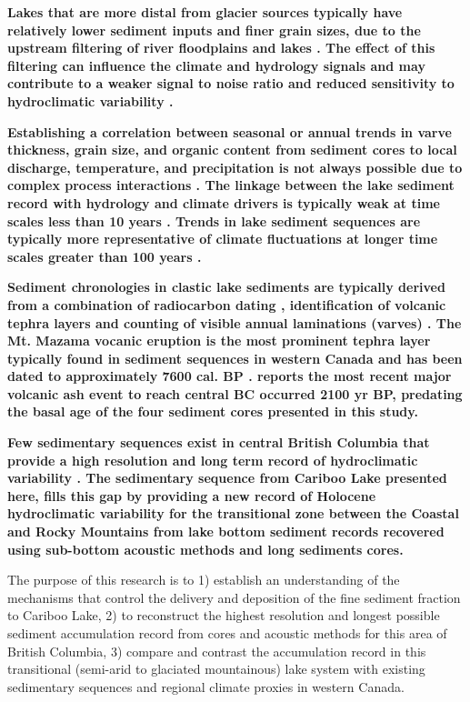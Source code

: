 \documentclass[Royal,times,doublespace,sageh]{sagej}
\begin{document}
\textbf{Lakes that are more distal from glacier sources typically have
relatively lower sediment inputs and finer grain sizes, due to the
upstream filtering of river floodplains and lakes \citep{Hodder2007c}.
The effect of this filtering can influence the climate and hydrology
signals and may contribute to a weaker signal to noise ratio and reduced
sensitivity to hydroclimatic variability \citep{Jerolmack2010}.}

\textbf{Establishing a correlation between seasonal or annual trends in
varve thickness, grain size, and organic content from sediment cores to
local discharge, temperature, and precipitation is not always possible
due to complex process interactions
\citep{Hodder2007c, Menounos2008c, Heideman2017}. The linkage between
the lake sediment record with hydrology and climate drivers is typically
weak at time scales less than 10 years
\citep{Hodder2007c, Menounos2008c, Heideman2017}. Trends in lake
sediment sequences are typically more representative of climate
fluctuations at longer time scales greater than 100 years
\citep{Leonard1999, Osborn2007, Heideman2017}.}

\textbf{Sediment chronologies in clastic lake sediments are typically
derived from a combination of radiocarbon dating
\citep{Gilbert2012, Hodder2006b, Steinman2019}, identification of
volcanic tephra layers \citep{Gilbert2012, Hodder2006b, Steinman2019}
and counting of visible annual laminations (varves)
\citep{Hodder2006b, Heideman2015}. The Mt. Mazama vocanic eruption is
the most prominent tephra layer typically found in sediment sequences in
western Canada \citep{Gilbert2012, Steinman2019} and has been dated to
approximately 7600 cal. BP \citep{Zdanowicz1999, Hallett1997}.
\citet{Westgate1977} reports the most recent major volcanic ash event to
reach central BC occurred 2100 yr BP, predating the basal age of the
four sediment cores presented in this study.}

\textbf{Few sedimentary sequences exist in central British Columbia that
provide a high resolution and long term record of hydroclimatic
variability
\citep{Gilbert2012, Hodder2006b, Menounos2009b, Maurer2012b}. The
sedimentary sequence from Cariboo Lake presented here, fills this gap by
providing a new record of Holocene hydroclimatic variability for the
transitional zone between the Coastal and Rocky Mountains from lake
bottom sediment records recovered using sub-bottom acoustic methods and
long sediments cores.}

The purpose of this research is to 1) establish an understanding of the
mechanisms that control the delivery and deposition of the fine sediment
fraction to Cariboo Lake, 2) to reconstruct the highest resolution and
longest possible sediment accumulation record from cores and acoustic
methods for this area of British Columbia, 3) compare and contrast the
accumulation record in this transitional (semi-arid to glaciated
mountainous) lake system with existing sedimentary sequences and
regional climate proxies in western Canada.
\end{document}
